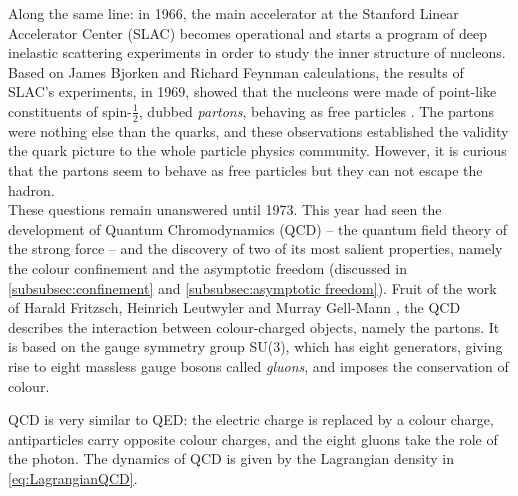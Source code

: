 Along the same line: in 1966, the main accelerator at the Stanford Linear Accelerator Center (SLAC) becomes operational and starts a program of deep inelastic scattering experiments in order to study the inner structure of nucleons. Based on James Bjorken \cite{bjorkenCurrentAlgebraSmall2018} and Richard Feynman  \cite{feynmanBehaviorHadronCollisions1988} calculations, the results of SLAC's experiments, in 1969, showed that the nucleons were made of point-like constituents of spin-$\frac{1}{2}$, dubbed \textit{partons}, behaving as free particles \cite{peskinIntroductionQuantumField2018}. The partons were nothing else than the quarks, and these observations established the validity the quark picture to the whole particle physics community. However, it is curious that the partons seem to behave as free particles but they can not escape the hadron.\\

These questions remain unanswered until 1973. This year had seen the development of Quantum Chromodynamics (QCD) -- the quantum field theory of the strong force -- and the discovery of two of its most salient properties, namely the colour confinement and the asymptotic freedom (discussed in \Sec\ref{subsubsec:confinement} and \ref{subsubsec:asymptotic freedom}). Fruit of the work of Harald Fritzsch, Heinrich Leutwyler and Murray Gell-Mann \cite{fritzschAdvantagesColorOctet1973}, the QCD describes the interaction between colour-charged objects, namely the partons. It is based on the gauge symmetry group SU(3), which has eight generators, giving rise to eight massless gauge bosons called \textit{gluons}, and imposes the conservation of colour. 

QCD is very similar to QED: the electric charge is replaced by a colour charge, antiparticles carry opposite colour charges, and the eight gluons take the role of the photon. The dynamics of QCD is given by the Lagrangian density in \eq\ref{eq:LagrangianQCD}.\\

